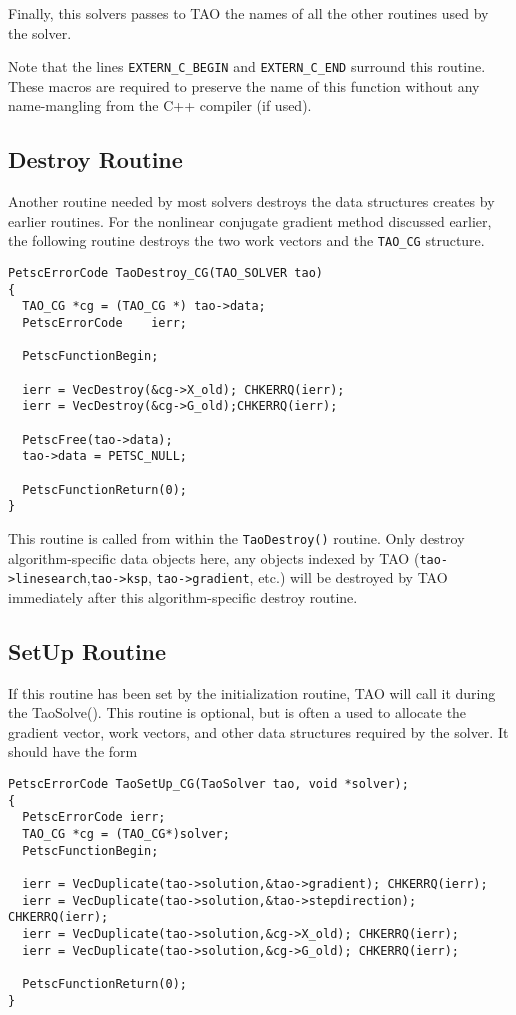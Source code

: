 Finally, this solvers passes to TAO the names of all the other routines
used by the solver.  

Note that the lines {\tt EXTERN\_C\_BEGIN} and {\tt EXTERN\_C\_END} surround
this routine.  These macros are required to preserve the name of this
function without any name-mangling from the C++ compiler (if used).

\subsection{Destroy Routine}
Another routine needed by most solvers destroys the data structures
creates by earlier routines.  For the nonlinear conjugate gradient
method discussed earlier, the following routine destroys the two
work vectors and the {\tt TAO\_CG} structure.
\begin{verbatim}
PetscErrorCode TaoDestroy_CG(TAO_SOLVER tao)
{
  TAO_CG *cg = (TAO_CG *) tao->data;
  PetscErrorCode    ierr;

  PetscFunctionBegin;

  ierr = VecDestroy(&cg->X_old); CHKERRQ(ierr);
  ierr = VecDestroy(&cg->G_old);CHKERRQ(ierr);

  PetscFree(tao->data);
  tao->data = PETSC_NULL;

  PetscFunctionReturn(0);
}
\end{verbatim}
This routine is called from within the {\tt TaoDestroy()} routine.
Only destroy algorithm-specific data objects here, any objects indexed by 
TAO ({\tt tao->linesearch},{\tt tao->ksp}, {\tt tao->gradient}, etc.)
will be destroyed by TAO immediately after this algorithm-specific destroy 
routine.


\subsection{SetUp Routine}
If this routine has been set by the initialization routine, TAO
will call it during the TaoSolve().
This routine is optional, but is often a used to allocate
the gradient vector, work vectors, and other data structures 
required by the solver.
It should have the form
\begin{verbatim}
PetscErrorCode TaoSetUp_CG(TaoSolver tao, void *solver);
{
  PetscErrorCode ierr;
  TAO_CG *cg = (TAO_CG*)solver;
  PetscFunctionBegin;

  ierr = VecDuplicate(tao->solution,&tao->gradient); CHKERRQ(ierr);
  ierr = VecDuplicate(tao->solution,&tao->stepdirection); CHKERRQ(ierr);
  ierr = VecDuplicate(tao->solution,&cg->X_old); CHKERRQ(ierr);
  ierr = VecDuplicate(tao->solution,&cg->G_old); CHKERRQ(ierr);

  PetscFunctionReturn(0);
}
\end{verbatim}

